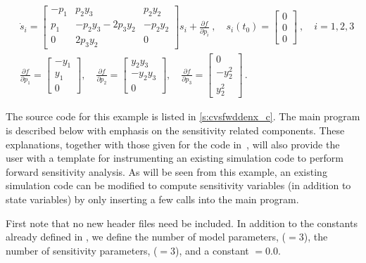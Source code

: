 \begin{equation}\label{e:cvsfwddenx_sens}
  \begin{split}
    & {\dot s}_i = 
    \begin{bmatrix}
      - p_1 &   p_2 y_3             &   p_2 y_2 \\
        p_1 & - p_2 y_3 - 2 p_3 y_2 & - p_2 y_2 \\
        0   &             2 p_3 y_2 &  0              
    \end{bmatrix}
    s_i + \frac{\partial f}{\partial p_i} ~,
    \quad s_i(t_0) = \begin{bmatrix} 0 \\ 0 \\ 0 \end{bmatrix}  ~,
    \quad i = 1,2,3 \\
    & \frac{\partial f}{\partial p_1} = \begin{bmatrix} -y_1 \\ y_1 \\ 0 \end{bmatrix}, \quad
    \frac{\partial f}{\partial p_2} = \begin{bmatrix} y_2 y_3 \\ -y_2 y_3 \\ 0 \end{bmatrix}, \quad
    \frac{\partial f}{\partial p_3} = \begin{bmatrix} 0 \\ - y_2^2 \\ y_2^2 \end{bmatrix} \, .
  \end{split}
\end{equation}

The source code for this example is listed in \A\ref{s:cvsfwddenx_c}. The main program is described 
below with emphasis on the sensitivity related components. 
These explanations, together with those given for the code 
in~\cite{cvode2.4.0_ex}, will also provide the user with a template for instrumenting 
an existing simulation code to perform forward sensitivity analysis.
As will be seen from this example, an existing simulation code can be modified to compute 
sensitivity variables (in addition to state variables) by only inserting a few {\cvodes} 
calls into the main program. 

First note that no new header files need be included. In addition to the constants already
defined in , we define the number of model parameters,  ($=3$),
the number of sensitivity parameters,  ($=3$), and a constant  $=0.0$. 

